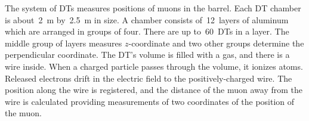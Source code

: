 The system of DTs measures positions of muons in the barrel. Each DT chamber is about~2~m by~2.5~m in size. A chamber consists of~12~layers of aluminum which are arranged in groups of four. There are up to~60~DTs in a layer. The middle group of layers measures $z$-coordinate and two other groups determine the perpendicular coordinate. The DT's volume is filled with a gas, and there is a wire inside. When a charged particle passes through the volume, it ionizes atoms. Released electrons drift in the electric field to the positively-charged wire. The position along the wire is registered, and the distance of the muon away from the wire is calculated providing measurements of two coordinates of the position of the muon.


